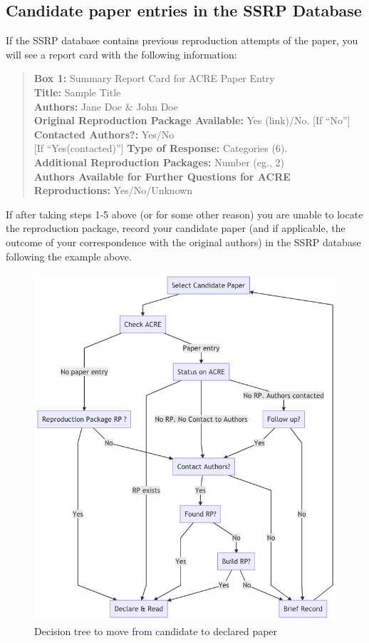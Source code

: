 \documentclass[
]{book}
\begin{document}
\hypertarget{check-acre}{%
\subsection{Candidate paper entries in the SSRP Database}\label{check-acre}}

If the SSRP database contains previous reproduction attempts of the paper, you will see a report card with the following information:

\begin{quote}
\textbf{Box 1:} Summary Report Card for ACRE Paper Entry\\
\textbf{Title:} Sample Title\\
\textbf{Authors:} Jane Doe \& John Doe\\
\textbf{Original Reproduction Package Available:} Yes (link)/No.
{[}If ``No''{]} \textbf{Contacted Authors?:} Yes/No\\
{[}If ``Yes(contacted)''{]} \textbf{Type of Response:} Categories (6).\\
\textbf{Additional Reproduction Packages:} Number (eg., 2)\\
\textbf{Authors Available for Further Questions for ACRE Reproductions:} Yes/No/Unknown
\end{quote}

If after taking steps 1-5 above (or for some other reason) you are unable to locate the reproduction package, record your candidate paper (and if applicable, the outcome of your correspondence with the original authors) in the SSRP database following the example above.

\begin{figure}
\includegraphics[width=0.8\linewidth]{candidate-to-declared-paper} \caption{Decision tree to move from candidate to declared paper}\label{fig:candidate-paper-dec-tree}
\end{figure}
\end{document}
